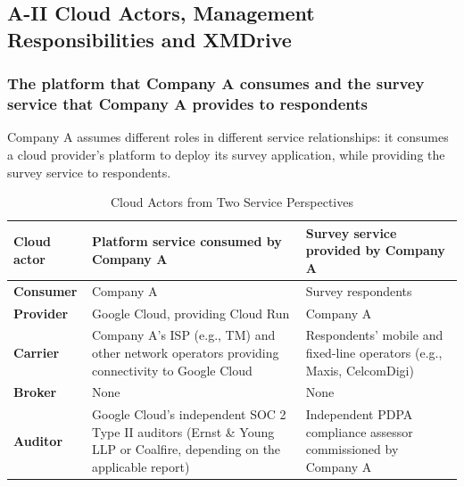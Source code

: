 \subsection{A-II Cloud Actors, Management Responsibilities and XMDrive}
\subsubsection{The platform that Company A consumes and the survey service that Company A provides
to respondents}

Company A assumes different roles in different service
relationships: it consumes a cloud provider's platform to deploy
its survey application, while providing the survey service to
respondents.
\begin{table}[H]
\centering
\small

\begin{tabularx}{\textwidth}{
    @{}
    >{\raggedright\arraybackslash}p{}
    >{\raggedright\arraybackslash}X
    >{\raggedright\arraybackslash}X
    @{}
}
\toprule

\textbf{Cloud actor}
&
\textbf{Platform service consumed by Company A}
&
\textbf{Survey service provided by Company A}
\\

\midrule

\textbf{Consumer}
&
Company A
&
Survey respondents
\\
\addlinespace

\textbf{Provider}
&
Google Cloud, providing Cloud Run
&
Company A
\\
\addlinespace

\textbf{Carrier}
&
Company A’s ISP (e.g., TM) and other network operators providing connectivity to Google Cloud
&
Respondents’ mobile and fixed-line operators (e.g., Maxis, CelcomDigi)
\\
\addlinespace

\textbf{Broker}
&
None
&
None
\\
\addlinespace

\textbf{Auditor}
&
Google Cloud’s independent SOC 2 Type II auditors (Ernst \& Young LLP or Coalfire, depending on the applicable report)
&
Independent PDPA compliance assessor commissioned by Company A
\\

\bottomrule
\end{tabularx}

\caption{Cloud Actors from Two Service Perspectives}
\label{tab:cloud-actors}
\end{table}
